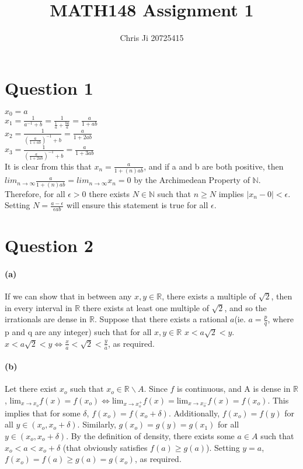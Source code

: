 \documentclass[10pt,letter]{article}
\begin{document}
\title{MATH148 Assignment 1}
\author{Chris Ji 20725415}
\maketitle

\section*{Question 1}
$x_0 = a$\\ 
$x_1 = \frac{1}{a^{-1}+b} = \frac{1}{\frac{1}{a}+\frac{ba}{a}} = \frac{a}{1+ab}$\\ 
$x_2 = \frac{1}{(\frac{a}{1+ab})^{-1}+b} = \frac{a}{1+2ab}$\\ 
$x_3 = \frac{1}{(\frac{a}{1+2ab})^{-1}+b} = \frac{a}{1+3ab}$\\ 
It is clear from this that $x_n = \frac{a}{1+(n)ab}$, and if a and b are both positive, then   $lim_{n\rightarrow\infty}\frac{a}{1+(n)ab} = lim_{n\rightarrow\infty}x_n = 0$ by the Archimedean Property of $\mathbb{N}$. \\ 
Therefore, for all $\epsilon>0$ there exists $N\in\mathbb{N}$ such that $n\geq N$ implies $|x_n-0|<\epsilon$. Setting $N = \frac{a-\epsilon}{\epsilon ab}$ will ensure this statement is true for all $\epsilon$.  


\section*{Question 2}

\paragraph{(a)} If we can show that in between any $x,y\in\mathbb{R}$, there exists a multiple of $\sqrt{2}$, then in every interval in $\mathbb{R}$ there exists at least one multiple of $\sqrt{2}$, and so the irrationals are dense in $\mathbb{R}$. Suppose that there exists a rational $a$(ie. $a = \frac{p}{q}$, where p and q are any integer) such that for all $x,y\in\mathbb{R}$ $x<a\sqrt{2}<y$. $x<a\sqrt{2}<y\Leftrightarrow \frac{x}{a}<\sqrt{2}<\frac{y}{a}$, as required. 

\paragraph{(b)} Let there exist $x_o$ such that $x_o\in\mathbb{R}\backslash A$. Since $f$ is continuous, and A is dense in $\mathbb{R}$, $\text{lim}_{x\rightarrow x_o}f(x)=f(x_o)\Leftrightarrow \text{lim}_{x\rightarrow x_o^+}f(x)=\text{lim}_{x\rightarrow x_o^-}f(x)=f(x_o)$. This implies that for some $\delta$, $f(x_o)=f(x_o+\delta)$. Additionally, $f(x_o)=f(y)$ for all $y\in(x_o,x_o+\delta)$. Similarly, $g(x_o)=g(y)=g(x_1)$ for all $y\in(x_o,x_o+\delta)$. By the definition of density, there exists some $a\in A$ such that $x_o<a<x_o+\delta$ (that obviously satisfies $f(a)\geq g(a)$). Setting $y=a$, $f(x_o)=f(a)\geq g(a)=g(x_o)$, as required. 
\end{document}
